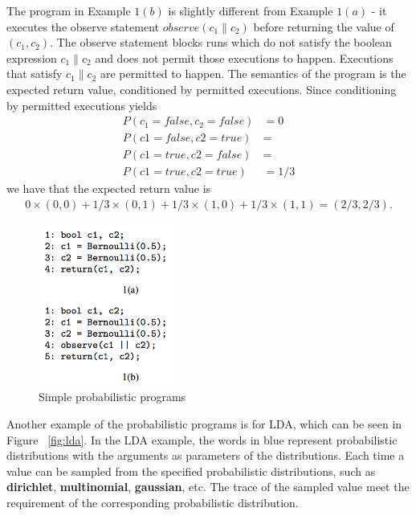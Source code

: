 The program in Example $1(b)$ is slightly different from Example $1(a)$ - it executes the observe statement $observe(c_1 \| c_2)$ before returning the value of $(c_1,c_2)$. The observe statement blocks runs which do not satisfy the boolean expression $c_1 \| c_2$ and does not permit those executions to happen. Executions that satisfy $c_1 \| c_2$ are permitted to happen. The semantics of the program is the expected return value, conditioned by permitted executions. Since conditioning by permitted executions yields
\begin{align*}
  P(c_1=false,c_2=false) &= 0 \\
  P(c1=false,c2=true) &= \\
  P(c1=true,c2=false) &= \\
  P(c1=true,c2=true) &= 1/3
\end{align*}
we have that the expected return value is 
\begin{align*}
  0 \times (0,0) + 1/3 \times (0,1) + 1/3 \times (1,0) + 1/3 \times (1,1) = (2/3,2/3).
\end{align*}

\begin{figure}
    \centering
    \includegraphics[width=0.4\textwidth]{figures/pp_simple_eg.png}
    \caption{Simple probabilistic programs}
    \label{fig:pp_simple_eg}
\end{figure}

Another example of the probabilistic programs is for LDA, which can be seen in Figure ~\ref{fig:lda}. In the LDA example, the words in blue represent probabilistic distributions with the arguments as parameters of the distributions. Each time a value can be sampled from the specified probabilistic distributions, such as \textbf{dirichlet}, \textbf{multinomial}, \textbf{gaussian}, etc. The trace of the sampled value meet the requirement of the corresponding probabilistic distribution. 

